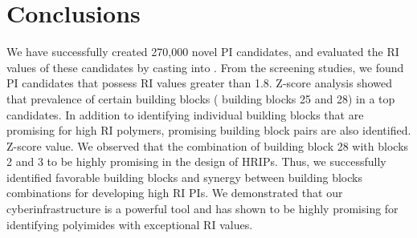 
\section{Conclusions}
\label{sec:conclusions3}

We have successfully created 270,000 novel PI candidates, and evaluated the RI values of these candidates by casting into \chemhtps. From the screening studies, we found PI candidates that possess RI values greater than 1.8. 
Z-score analysis showed that prevalence of certain building blocks ( \eg building blocks 25 and 28) in a top candidates. In addition to identifying individual building blocks that are promising for high RI polymers, promising building block pairs are also identified.  Z-score value. We observed that the combination of building block 28 with blocks 2 and 3 to be highly promising in the design of HRIPs. Thus, we successfully identified favorable building blocks and synergy between building blocks combinations for developing high RI PIs. We demonstrated that our cyberinfrastructure is a powerful tool and has shown to be highly promising for identifying polyimides with exceptional RI values.
